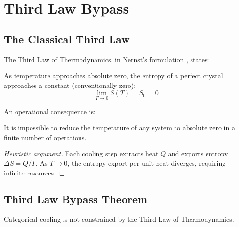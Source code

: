 \section{Third Law Bypass}

\subsection{The Classical Third Law}

The Third Law of Thermodynamics, in Nernst's formulation \cite{nernst1906}, states:

\begin{principle}
\label{principle:nernst}
As temperature approaches absolute zero, the entropy of a perfect crystal approaches a constant (conventionally zero):
\begin{equation}
\lim_{T \to 0} S(T) = S_0 = 0
\end{equation}
\end{principle}

An operational consequence is:

\begin{principle}
\label{principle:unattainability}
It is impossible to reduce the temperature of any system to absolute zero in a finite number of operations.
\end{principle}

\begin{proof}[Heuristic argument]
Each cooling step extracts heat $Q$ and exports entropy $\Delta S = Q/T$. As $T \to 0$, the entropy export per unit heat diverges, requiring infinite resources.
\end{proof}

\subsection{Third Law Bypass Theorem}

\begin{theorem}
\label{thm:third_law_bypass}
Categorical cooling is not constrained by the Third Law of Thermodynamics.
\end{theorem}

